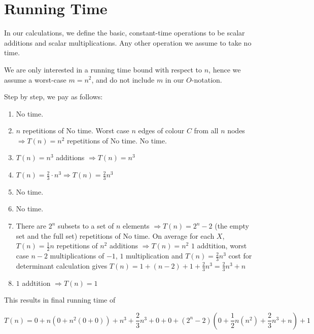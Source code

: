 \documentclass{tufte-handout}
\begin{document}
\section{Running Time}
In our calculations, we define the basic, constant-time operations to be scalar additions and scalar multiplications. Any other operation we assume to take no time.

We are only interested in a running time bound with respect to $n$, hence we assume a worst-case $m = n^2$, and do not include $m$ in our $O$-notation.

Step by step, we pay as follows:

\begin{enumerate}
\item No time.
\item $n$ repetitions of
\subitem No time.
\subitem Worst case $n$ edges of colour $C$ from all $n$ nodes $\Rightarrow T(n) = n^2$ repetitions of
\subsubitem No time.
\subsubitem No time.
\item $T(n) = n^3$ additions $\Rightarrow T(n) = n^3$
\item $T(n) = \frac{2}{3}\cdot n^3 \Rightarrow T(n) =\frac{2}{3} n^3$ 
\item No time.
\item No time.
\item There are $2^n$ subsets to a set of $n$ elements $\Rightarrow T(n) = 2^n - 2$ (the empty set and the full set) repetitions of
\subitem No time.
\subitem On average for each $X$, $T(n) = \frac{1}{2} n$  repetitions of
\subsubitem $n^2$ additions $\Rightarrow T(n) = n^2$
\subitem $1$ addtition, worst case $n - 2$ multiplications of $-1$, $1$ multiplication and $T(n) = \frac{2}{3}n^3$ cost for determinant calculation gives $T(n) = 1 + (n - 2) + 1 + \frac{2}{3}n^3 = \frac{2}{3}n^3 + n$
\item $1$ addtition $\Rightarrow T(n) = 1$
\end{enumerate}

This results in final running time of

$$
T(n) = 0 + n(0 + n^2(0 + 0)) + n^3 + \frac{2}{3}n^3 + 0 + 0 + (2^n - 2)(0 + \frac{1}{2}n (n^2) + \frac{2}{3}n^3 + n) + 1
$$
\end{document}
